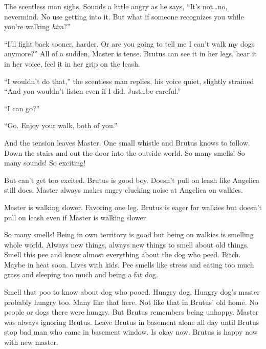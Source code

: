 The scentless man sighs.  Sounds a little angry as he says, ``It's not\ldots no, nevermind.  No use getting into it.  But what if someone recognizes you while you're walking \emph{him}?''



``I'll fight back sooner, harder.  Or are you going to tell me I can't walk my dogs anymore?''  All of a sudden, Master is tense.  Brutus can see it in her legs, hear it in her voice, feel it in her grip on the leash.



``I wouldn't do that,'' the scentless man replies, his voice quiet, slightly strained ``And you wouldn't listen even if I did.  Just\ldots be careful.''



``I can go?''



``Go.  Enjoy your walk, both of you.''



And the tension leaves Master.  One small whistle and Brutus knows to follow.  Down the stairs and out the door into the outside world.  So many smells!  So many sounds!  So exciting!



But can't get too excited.  Brutus is good boy.  Doesn't pull on leash like Angelica still does.  Master always makes angry clucking noise at Angelica on walkies.



Master is walking slower.  Favoring one leg.  Brutus is eager for walkies but doesn't pull on leash even if Master is walking slower.



So many smells!  Being in own territory is good but being on walkies is smelling whole world.  Always new things, always new things to smell about old things.  Smell this pee and know almost everything about the dog who peed.  Bitch.  Maybe in heat soon.  Lives with kids.  Pee smells like stress and eating too much grass and sleeping too much and being a fat dog.



Smell that poo to know about dog who pooed.  Hungry dog.  Hungry dog's master probably hungry too.  Many like that here.  Not like that in Brutus' old home.  No people or dogs there were hungry.  But Brutus remembers being unhappy.  Master was always ignoring Brutus.  Leave Brutus in basement alone all day until Brutus stop bad man who came in basement window.  Is okay now.  Brutus is happy now with new master.



